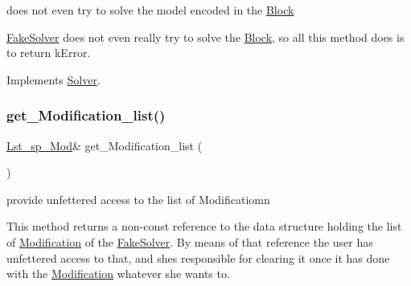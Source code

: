 does not even try to solve the model encoded in the \mbox{\hyperlink{class_s_m_spp__di__unipi__it_1_1_block}{Block}} 

\mbox{\hyperlink{class_s_m_spp__di__unipi__it_1_1_fake_solver}{Fake\+Solver}} does not even really try to solve the \mbox{\hyperlink{class_s_m_spp__di__unipi__it_1_1_block}{Block}}, so all this method does is to return k\+Error. 

Implements \mbox{\hyperlink{class_s_m_spp__di__unipi__it_1_1_solver_a504d4e3e174c7a518cc66156a8a45ce5}{Solver}}.

\mbox{\label{class_s_m_spp__di__unipi__it_1_1_fake_solver_ab664872065ad03ccd0ec9f0319a1e15a}} 
\subsubsection{\texorpdfstring{get\+\_\+\+Modification\+\_\+list()}{get\_Modification\_list()}}
{\footnotesize\ttfamily \mbox{\hyperlink{group___modification___t_y_p_e_s_ga8a83b63d7963bc839660db495458f26d}{Lst\+\_\+sp\+\_\+\+Mod}}\& get\+\_\+\+Modification\+\_\+list (\begin{DoxyParamCaption}\item[{void}]{ }\end{DoxyParamCaption})\hspace{0.3cm}{\ttfamily [inline]}}



provide unfettered access to the list of Modificatiomn 

This method returns a non-\/const reference to the data structure holding the list of \mbox{\hyperlink{class_s_m_spp__di__unipi__it_1_1_modification}{Modification}} of the \mbox{\hyperlink{class_s_m_spp__di__unipi__it_1_1_fake_solver}{Fake\+Solver}}. By means of that reference the user has unfettered access to that, and she\textquotesingle{}s responsible for clearing it once it has done with the \mbox{\hyperlink{class_s_m_spp__di__unipi__it_1_1_modification}{Modification}} whatever she wants to. \mbox{\label{class_s_m_spp__di__unipi__it_1_1_fake_solver_ac83fa9679882440d13fb5940494699c5}} 
